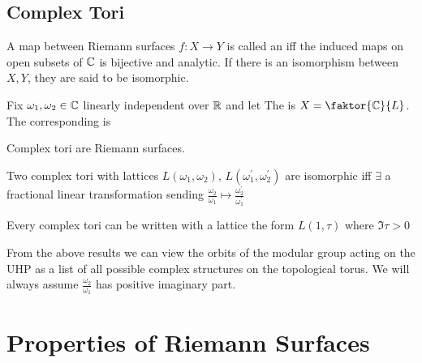 \documentclass{article}
\begin{document}
\subsection{Complex Tori}

\begin{definition}
	A map between Riemann surfaces $f:X \to Y$ is called an  iff the induced maps on open subsets of $\mathbb{C}$ is bijective and analytic. If there is an isomorphism between $X,Y$, they are said to be isomorphic.  
\end{definition}

\begin{definition}
	Fix $\omega_1, \omega_2 \in \mathbb{C}$ linearly independent over $\mathbb{R}$ and let 
	The  is $X = \faktor{\mbb{C}}{L}$. The corresponding  is 
	\eq{
		\mf{F} = \mf{F}(X) = \pbrace{\alpha \omega_1+ \beta \omega_2 \, | \, \alpha,\beta \in [0,1)}
	}
\end{definition}

\begin{prop}
	Complex tori are Riemann surfaces. 
\end{prop}

\begin{prop}
	Two complex tori with lattices $L(\omega_1, \omega_2), \, L(\omega_1^\prime, \omega_2^\prime)$ are isomorphic iff $\exists$ a fractional linear transformation sending $\frac{\omega_2}{\omega_1} \mapsto \frac{\omega_2^\prime}{\omega_1^\prime}$
\end{prop}

\begin{prop}
	Every complex tori can be written with a lattice the form $L(1,\tau)$ where $\Im\tau > 0$
\end{prop}

\begin{remark}
	From the above results we can view the orbits of the modular group acting on the UHP as a list of all possible complex structures on the topological torus. We will always assume $\frac{\omega_2}{\omega_1}$ has positive imaginary part.  
\end{remark}

\section{Properties of Riemann Surfaces}
\end{document}
